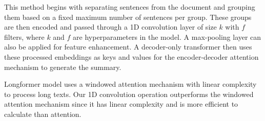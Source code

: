 This method begins with separating sentences from the document and grouping them
based on a fixed maximum number of sentences per group.
These groups are then encoded and passed through a 1D convolution layer of size $k$ with $f$ filters, where $k$ and $f$ are hyperparameters in the model.
A max-pooling layer can also be applied for feature enhancement.
A decoder-only transformer then uses these processed embeddings as keys and values
for the encoder-decoder attention mechanism to generate the summary.

Longformer model \cite{beltagy2020longformer} uses a windowed attention mechanism with
linear complexity to process long texts.
Our 1D convolution operation outperforms the windowed attention mechanism since it has
linear complexity and is more efficient to calculate than attention.
